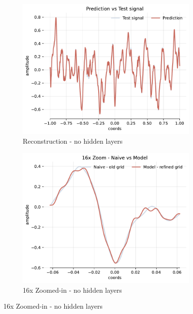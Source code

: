 \begin{figure}[!h]
    \centering
    \begin{subfigure}[b]{0.32\textwidth}
        \centering
        \includegraphics[width=\textwidth]{img/ch3/pred-2048hf-0hl-96w-sub3.pdf}
        \caption{Reconstruction - no hidden layers}
    \end{subfigure}
    \begin{subfigure}[b]{0.32\textwidth}
        \centering
        \includegraphics[width=\textwidth]{img/ch3/16x-2048hf-0hl-96w-sub3.pdf}
        \caption{16x Zoomed-in - no hidden layers}
    \end{subfigure}

\end{figure}
